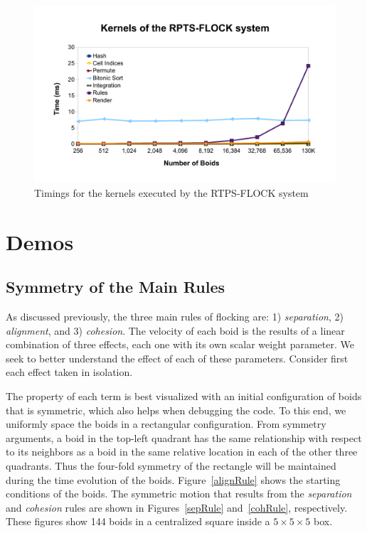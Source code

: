 \begin{figure}[htbp]
\begin{center}
\includegraphics[scale=0.7]{figures/kernelsPlot.pdf}
\caption{Timings for the kernels executed by the RTPS-FLOCK system}
\label{kernelBench}
\end{center}
\end{figure}


\section{Demos}

\subsection{Symmetry of the Main Rules}
As discussed previously, the three main rules of flocking are: 1) \textit{separation}, 2) \textit{alignment}, and 3) \textit{cohesion}. The velocity of each boid is the results of a linear combination of three effects, each one with its own scalar weight parameter. We seek to better understand the effect of each of these parameters. Consider first each effect taken in isolation.

The property of each term is best visualized with an initial configuration of boids that is symmetric, which also helps when debugging the code. To this end, we uniformly space the boids in a rectangular configuration.  From symmetry arguments, a boid in the top-left quadrant has the same relationship with respect to its neighbors as a boid in the same relative location in each of the other three quadrants. Thus the four-fold symmetry of the rectangle will be maintained during the time evolution of the boids. Figure~\ref{alignRule} shows the starting conditions of the boids. The symmetric motion that results from the \textit{separation} and \textit{cohesion} rules are shown in Figures~\ref{sepRule} and~\ref{cohRule}, respectively. These figures show 144 boids in a centralized square inside a $5\times 5\times 5$ box.

